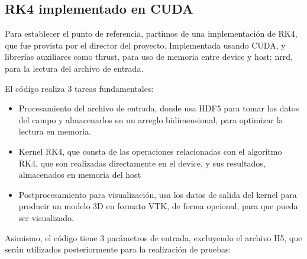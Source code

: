 \subsection{RK4 implementado en CUDA}

Para establecer el punto de referencia, partimos de una implementación de RK4, que fue provista por el director del proyecto. Implementada usando CUDA, y librerías auxiliares como thrust, para uso de memoria entre device y host; nrrd, para la lectura del archivo de entrada.

El código realiza 3 tareas fundamentales:

\begin{itemize}
	\item Procesamiento del archivo de entrada, donde usa HDF5 para tomar los datos del campo y almacenarlos en un arreglo bidimensional, para optimizar la lectura en memoria.

	\item Kernel RK4, que consta de las operaciones relacionadas con el algoritmo RK4, que son realizadas directamente en el device, y sus resultados, almacenados en memoria del host

	\item Postprocesamiento para visualización, usa los datos de salida del kernel para producir un modelo 3D en formato VTK, de forma opcional, para que pueda ser visualizado.
\end{itemize}

Asimismo, el código tiene 3 parámetros de entrada, excluyendo el archivo H5, que serán utilizados posteriormente para la realización de pruebas:



